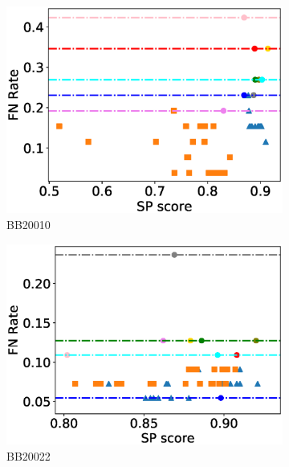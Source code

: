 \begin{figure}[!htbp]
\begin{adjustwidth}{-1cm}{-1cm}
\begin{subfigure}{0.22\textwidth}
			\includegraphics[width=\columnwidth]{Figure/summary/precomputedInit/Balibase/BB20010_fnrate_vs_sp_2}
			\caption{BB20010}
		\end{subfigure}
		\begin{subfigure}{0.22\textwidth}
			\includegraphics[width=\columnwidth]{Figure/summary/precomputedInit/Balibase/BB20022_fnrate_vs_sp_2}
			\caption{BB20022}
		\end{subfigure}
		\begin{subfigure}{0.22\textwidth}

\end{subfigure}
\end{adjustwidth}
\end{figure}
